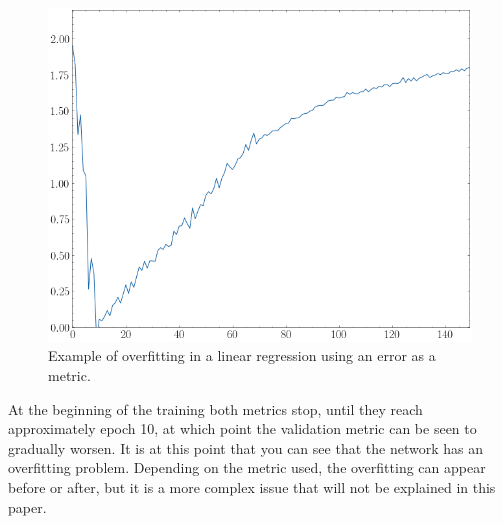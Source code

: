 \begin{figure}[H]
    \centering
    \includegraphics[width=12cm]{images/state-of-art/overfitting/overfitting-loss.png}
    \caption{Example of overfitting in a linear regression using an error as a metric.}
    \label{fig:overfitting}
\end{figure}

At the beginning of the training both metrics stop, until they reach approximately epoch 10, at which point the validation metric can be seen to gradually worsen. It is at this point that you can see that the network has an overfitting problem. Depending on the metric used, the overfitting can appear before or after, but it is a more complex issue that will not be explained in this paper.
\newline

